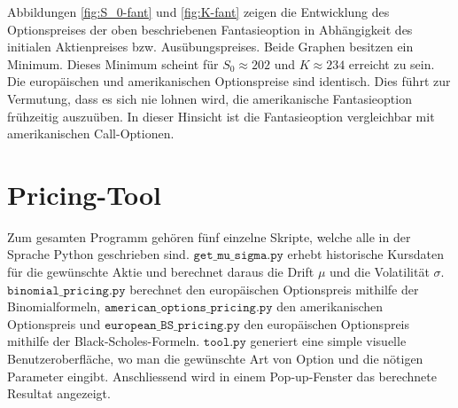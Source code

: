 \documentclass[11pt]{report} %
\begin{document}
Abbildungen \ref{fig:S_0-fant} und \ref{fig:K-fant} zeigen die Entwicklung des Optionspreises der oben beschriebenen Fantasieoption in Abhängigkeit des initialen Aktienpreises bzw. Ausübungspreises. Beide Graphen besitzen ein Minimum. Dieses Minimum scheint für $S_0\approx202$ und $K\approx234$ erreicht zu sein. Die europäischen und amerikanischen Optionspreise sind identisch. Dies führt zur Vermutung, dass es sich nie lohnen wird, die amerikanische Fantasieoption frühzeitig auszuüben. In dieser Hinsicht ist die Fantasieoption vergleichbar mit amerikanischen Call-Optionen.
\chapter{Pricing-Tool}
Zum gesamten Programm gehören fünf einzelne Skripte, welche alle in der Sprache Python geschrieben sind. $\texttt{get\_mu\_sigma.py}$ erhebt historische Kursdaten für die gewünschte Aktie und berechnet daraus die Drift $\mu$ und die Volatilität $\sigma$. $\texttt{binomial\_pricing.py}$ berechnet den europäischen Optionspreis mithilfe der Binomialformeln, $\texttt{american\_options\_pricing.py}$ den amerikanischen Optionspreis und $\texttt{european\_BS\_pricing.py}$ den europäischen Optionspreis mithilfe der Black-Scholes-Formeln. $\texttt{tool.py}$ generiert eine simple visuelle Benutzeroberfläche, wo man die gewünschte Art von Option und die nötigen Parameter eingibt. Anschliessend wird in einem Pop-up-Fenster das berechnete Resultat angezeigt.
\end{document}
